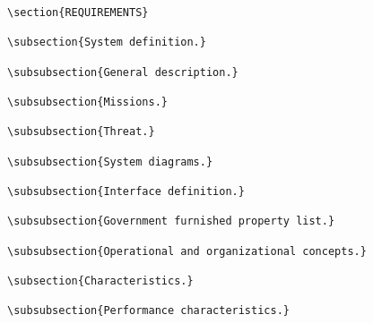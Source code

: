 \begin{itemize}
\begin{small}
\begin{verbatim}
\section{REQUIREMENTS}

\subsection{System definition.}

\subsubsection{General description.}

\subsubsection{Missions.}

\subsubsection{Threat.}

\subsubsection{System diagrams.}

\subsubsection{Interface definition.}

\subsubsection{Government furnished property list.}

\subsubsection{Operational and organizational concepts.}

\subsection{Characteristics.}

\subsubsection{Performance characteristics.}


\end{verbatim}
\end{small}
\end{itemize}
